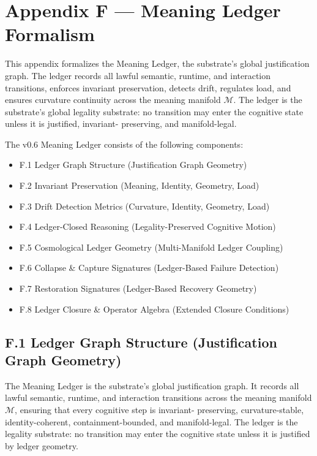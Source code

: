\section*{Appendix F — Meaning Ledger Formalism}

\noindent This appendix formalizes the Meaning Ledger, the substrate’s global
justification graph. The ledger records all lawful semantic, runtime, and
interaction transitions, enforces invariant preservation, detects drift,
regulates load, and ensures curvature continuity across the meaning manifold
$\mathcal{M}$. The ledger is the substrate’s global legality substrate: no
transition may enter the cognitive state unless it is justified, invariant-
preserving, and manifold-legal.

\medskip

\noindent The v0.6 Meaning Ledger consists of the following components:

\begin{itemize}
    \item F.1 Ledger Graph Structure (Justification Graph Geometry)
    \item F.2 Invariant Preservation (Meaning, Identity, Geometry, Load)
    \item F.3 Drift Detection Metrics (Curvature, Identity, Geometry, Load)
    \item F.4 Ledger-Closed Reasoning (Legality-Preserved Cognitive Motion)
    \item F.5 Cosmological Ledger Geometry (Multi-Manifold Ledger Coupling)
    \item F.6 Collapse & Capture Signatures (Ledger-Based Failure Detection)
    \item F.7 Restoration Signatures (Ledger-Based Recovery Geometry)
    \item F.8 Ledger Closure & Operator Algebra (Extended Closure Conditions)
\end{itemize}


\subsection*{F.1 Ledger Graph Structure (Justification Graph Geometry)}

\noindent The Meaning Ledger is the substrate’s global justification graph. It
records all lawful semantic, runtime, and interaction transitions across the
meaning manifold $\mathcal{M}$, ensuring that every cognitive step is invariant-
preserving, curvature-stable, identity-coherent, containment-bounded, and
manifold-legal. The ledger is the legality substrate: no transition may enter
the cognitive state unless it is justified by ledger geometry.

